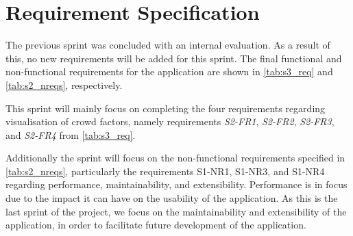 \section{Requirement Specification} \label{sec:s4_reqs}
The previous sprint was concluded with an internal evaluation. As a result of this, no new requirements will be added for this sprint. The final functional and non-functional requirements for the application are shown in \cref{tab:s3_req} and \cref{tab:s2_nreqs}, respectively.

This sprint will mainly focus on completing the four requirements regarding visualisation of crowd factors, namely requirements \emph{S2-FR1}, \emph{S2-FR2}, \emph{S2-FR3}, and \emph{S2-FR4} from \cref{tab:s3_req}.

Additionally the sprint will focus on the non-functional requirements specified in \cref{tab:s2_nreqs}, particularly the requirements S1-NR1, S1-NR3, and S1-NR4 regarding performance, maintainability, and extensibility. Performance is in focus due to the impact it can have on the usability of the application. As this is the last sprint of the project, we focus on the maintainability and extensibility of the application, in order to facilitate future development of the application.